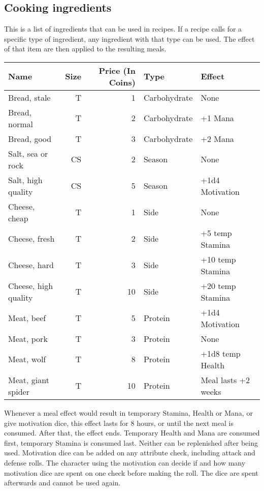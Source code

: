 \subsection{Cooking ingredients}\label{subsec:cookingIngredients}
This is a list of ingredients that can be used in recipes.
If a recipe calls for a specific type of ingredient, any ingredient with that type can be used.
The effect of that item are then applied to the resulting meals.
\begin{longtable}{l | r | r | l | p{3cm} }
	Name & Size & Price (In Coins) & Type & Effect\\ \hline
	Bread, stale & T & 1 & Carbohydrate & None\\
	Bread, normal & T & 2 & Carbohydrate & +1 Mana\\
	Bread, good & T & 3 & Carbohydrate & +2 Mana\\
	Salt, sea or rock & CS & 2 & Season & None\\
	Salt, high quality & CS & 5 & Season & +1d4 Motivation\\
	Cheese, cheap & T & 1 & Side & None\\
	Cheese, fresh & T & 2 & Side & +5 temp Stamina\\
	Cheese, hard & T & 3 & Side & +10 temp Stamina\\
	Cheese, high quality & T & 10 & Side & +20 temp Stamina\\
	Meat, beef & T & 5 & Protein & +1d4 Motivation\\
	Meat, pork & T & 3 & Protein & None \\
	Meat, wolf & T & 8 & Protein & +1d8 temp Health\\
	Meat, giant spider & T & 10 & Protein & Meal lasts +2 weeks\\
\end{longtable}

Whenever a meal effect would result in temporary Stamina, Health or Mana, or give motivation dice, this effect lasts for 8 hours, or until the next meal is consumed.
After that, the effect ends.
Temporary Health and Mana are consumed first, temporary Stamina is consumed last.
Neither can be replenished after being used.
Motivation dice can be added on any attribute check, including attack and defense rolls.
The character using the motivation can decide if and how many motivation dice are spent on one check before making the roll.
The dice are spent afterwards and cannot be used again.\\

